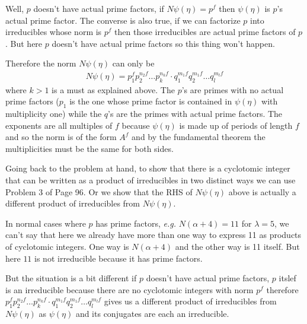 \documentclass[aps,preprint,preprintnumbers,nofootinbib,showpacs,prd]{revtex4-1}
\newcommand{\eg}{{\it e.g.} }
\newcommand{\nbea}{\begin{eqnarray*}}
\newcommand{\neea}{\end{eqnarray*}}
\begin{document}
Well, $p$ doesn't have actual prime factors, if $N\psi(\eta) = p^f$ then $\psi(\eta)$ is $p$'s actual prime factor. The converse is also true, if we can factorize $p$ into irreducibles whose norm is $p^f$ then those irreducibles are actual prime factors of $p$. But here $p$ doesn't have actual prime factors so this thing won't happen.

Therefore the norm $N\psi(\eta)$ can only be
%
\nbea
N\psi(\eta) = p_1^f p_2^{n_2f} \dots p_k^{n_k f} \cdot q_1^{m_1 f} q_2^{m_1 f} \dots q_l^{m_l f}
\neea
%
where $k > 1$ is a must as explained above. The $p$'s are primes with no actual prime factors ($p_1$ is the one whose prime factor is contained in $\psi(\eta)$ with multiplicity one) while the $q$'s are the primes with actual prime factors. The exponents are all multiples of $f$ because $\psi(\eta)$ is made up of periods of length $f$ and so the norm is of the form $A^f$ and by the fundamental theorem the multiplicities must be the same for both sides.

Going back to the problem at hand, to show that there is a cyclotomic integer that can be written as a product of irreducibles in two distinct ways we can use Problem 3 of Page 96. Or we show that the RHS of $N\psi(\eta)$ above is actually a different product of irreducibles from $N\psi(\eta)$.

In normal cases where $p$ has prime factors, \eg $N(\alpha + 4) = 11$ for $\lambda = 5$, we can't say that here we already have more than one way to express 11 as products of cyclotomic integers. One way is $N(\alpha + 4)$ and the other way is 11 itself. But here $11$ is not irreducible because it has prime factors.

But the situation is a bit different if $p$ doesn't have actual prime factors, $p$ itslef is an irreducible because there are no cyclotomic integers with norm $p^f$ therefore $p_1^f p_2^{n_2f} \dots p_k^{n_k f} \cdot q_1^{m_1 f} q_2^{m_1 f} \dots q_l^{m_l f}$ gives us a different product of irreducibles from $N\psi(\eta)$ as $\psi(\eta)$ and its conjugates are each an irreducible.
\end{document}
